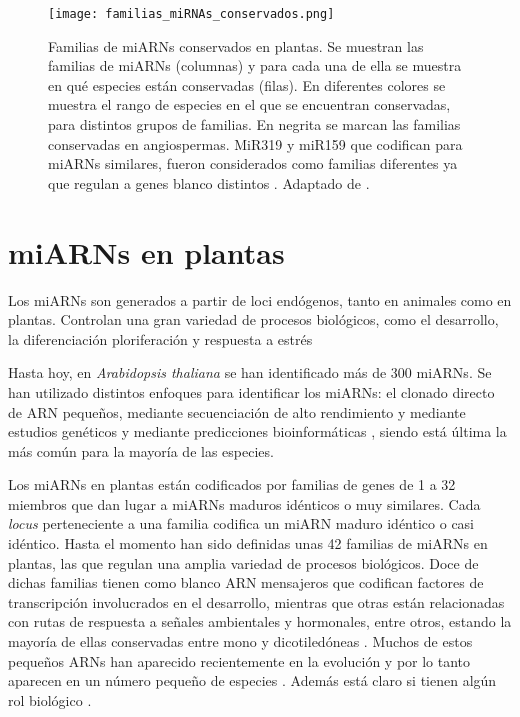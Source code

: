 \begin{figure}[htbp!] 
    \centering    
    \texttt{[image: familias\_miRNAs\_conservados.png]}
    \caption[Familias de miARNs conservados en plantas]{
    Familias de miARNs conservados en plantas.
    Se muestran las familias de miARNs (columnas) y para cada una de ella se muestra en qué especies están conservadas (filas).
    En diferentes colores se muestra el rango de especies en el que se encuentran conservadas, para distintos grupos de familias.
    En negrita se marcan las familias conservadas en angiospermas. 
    MiR319 y miR159 que codifican para miARNs similares, fueron considerados como familias diferentes ya que regulan a genes blanco distintos \citep{Palatnik2007}.
    Adaptado de \citep{citeulike:8816489}.
    }
    \label{fig:familias_miRNAs_conservados}
\end{figure}



\section{miARNs en plantas}

Los miARNs son generados a partir de loci endógenos, tanto en animales como en plantas. 
Controlan una gran variedad de procesos biológicos, como el desarrollo, la diferenciación ploriferación y respuesta a estrés \citep{Voinnet2009669,pmid25118717,citeulike:8816489,pmid12869753,Axtell2008}

Hasta hoy, en \textit{Arabidopsis thaliana} se han identificado más de 300 \citep{Kozomara2014} miARNs.
Se han utilizado distintos enfoques para identificar los miARNs: el clonado directo de ARN pequeños, mediante secuenciación de alto rendimiento y mediante estudios genéticos y mediante predicciones bioinformáticas \citep{citeulike:8816489}, siendo está última la más común para la mayoría de las especies.

Los miARNs en plantas están codificados por familias de genes de 1 a 32 miembros que dan lugar a miARNs maduros idénticos o muy similares.
Cada \textit{locus} perteneciente a una familia codifica un miARN maduro idéntico o casi idéntico.
Hasta el momento han sido definidas unas 42 familias de miARNs en plantas, las que regulan una amplia variedad de procesos biológicos.
Doce de dichas familias tienen como blanco ARN mensajeros que codifican factores de transcripción involucrados en el desarrollo, mientras que otras están relacionadas con rutas de respuesta a señales ambientales y hormonales, entre otros, estando la mayoría de ellas conservadas entre mono y dicotiledóneas \citep{Jones-Rhoades2006}.
Muchos de estos pequeños ARNs han aparecido recientemente en la evolución y por lo tanto aparecen en un número pequeño de especies \citep{Axtell2008,Axtell2008343}. Además está claro si tienen algún rol biológico \citep{Axtell2008343,citeulike:8816489}.

